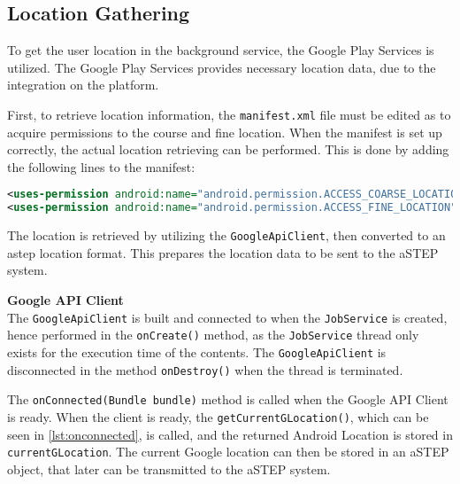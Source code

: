\subsection{Location Gathering} \label{section:locationgathering}
To get the user location in the background service, the Google Play Services is utilized.
The Google Play Services provides necessary location data, due to the integration on the platform.

First, to retrieve location information, the \texttt{manifest.xml} file must be edited as to acquire permissions to the course and fine location.
When the manifest is set up correctly, the actual location retrieving can be performed.
This is done by adding the following lines to the manifest:
\begin{lstlisting}[language=XML]
<uses-permission android:name="android.permission.ACCESS_COARSE_LOCATION"/>
<uses-permission android:name="android.permission.ACCESS_FINE_LOCATION"/>
\end{lstlisting}

The location is retrieved by utilizing the \texttt{GoogleApiClient}, then converted to an \gls{astep} location format.
This prepares the location data to be sent to the aSTEP system.


\textbf{Google API Client}\\
The \texttt{GoogleApiClient} is built and connected to when the \texttt{JobService} is created, hence performed in the \texttt{onCreate()} method, as the \texttt{JobService} thread only exists for the execution time of the contents.
The \texttt{GoogleApiClient} is disconnected in the method \texttt{onDestroy()} when the thread is terminated.

\iffalse
\begin{lstlisting}[caption={onCreate()},label={lst:oncreate},language=Java]
@Override
public void onCreate() {
	// Set the current Context to this
	context = this;
	// Builds the Google API Client to enable location
	buildGoogleApiClient();
	// Connects the Google API Client. It broadcasts to onConnect() when connected.
	connectApi();
}
\end{lstlisting}
\fi



The \texttt{onConnected(Bundle bundle)} method is called when the Google API Client is ready.
When the client is ready, the \texttt{getCurrentGLocation()}, which can be seen in \ref{lst:onconnected}, is called, and the returned Android Location is stored in \texttt{currentGLocation}. 
The current Google location can then be stored in an aSTEP object, that later can be transmitted to the aSTEP system.

